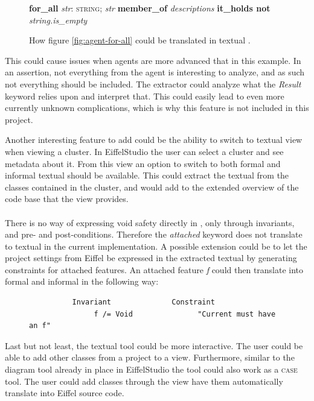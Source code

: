 \begin{figure}[h]
\centerline{
\footnotesize{\textbf{for\_all} \textit{str}: \textsc{string}; \textit{str} \textbf{member\_of} \textit{descriptions} \textbf{it\_holds not} \textit{string.is\_empty}}
}
\caption{How figure \ref{fig:agent-for-all} could be translated in textual \bon.}
\label{fig:bon-for-all}
\end{figure}
This could cause issues when agents are more advanced that in this example. In an assertion, not everything from the agent is interesting to analyze, and as such not everything should be included. The extractor could analyze what the \textit{Result} keyword relies upon and interpret that. This could easily lead to even more currently unknown complications, which is why this feature is not included in this project.

Another interesting feature to add could be the ability to switch to textual \bon{} view when viewing a cluster. In EiffelStudio the user can select a cluster and see metadata about it. From this view an option to switch to both formal and informal textual \bon{} should be available. This could extract the textual \bon{} from the classes contained in the cluster, and would add to the extended overview of the code base that the \bon{} view provides.

\paragraph{}
There is no way of expressing void safety directly in \bon, only through invariants, and pre- and post-conditions. Therefore the \textit{attached} keyword does not translate to textual \bon{} in the current implementation. A possible extension could be to let the project settings from Eiffel be expressed in the extracted textual \bon{} by generating constraints for attached features. An attached feature \textit{f} could then translate into formal and informal \bon{} in the following way:
\begin{figure}
\footnotesize
\begin{verbatim}
          Invariant              Constraint
               f /= Void               "Current must have an f"
\end{verbatim}
\end{figure}

\normalsize Last but not least, the textual \bon{} tool could be more interactive. The user could be able to add other classes from a project to a \bon{} view. Furthermore, similar to the diagram tool already in place in EiffelStudio the \bon{} tool could also work as a \textsc{case} tool. The user could add classes through the \bon{} view have them automatically translate into Eiffel source code.

